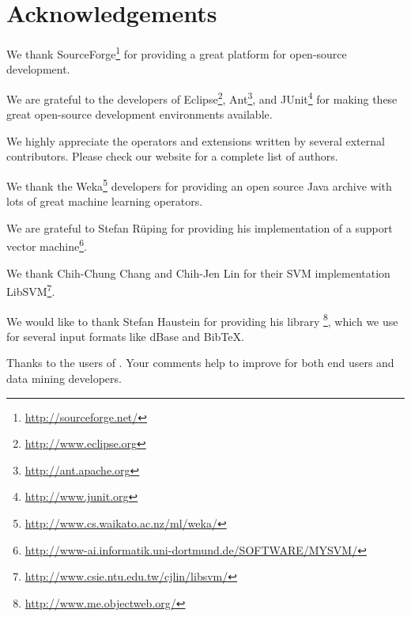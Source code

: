 \chapter{Acknowledgements}
\label{sec:Acknowledgements}

We thank SourceForge\footnote{\url{http://sourceforge.net/}} for providing a
great platform for open-source development.

We are grateful to the developers of
Eclipse\footnote{\url{http://www.eclipse.org}},
Ant\footnote{\url{http://ant.apache.org}}, and
JUnit\footnote{\url{http://www.junit.org}} for making these great
open-source development environments available.

We highly appreciate the operators and extensions written by several external
contributors. Please check our website for a complete list of authors.

We thank the Weka\footnote{\url{http://www.cs.waikato.ac.nz/ml/weka/}} developers for
providing an open source Java archive with lots of great machine learning
operators.

We are grateful to Stefan R\"uping for providing his implementation of a
support vector machine\footnote{\url{http://www-ai.informatik.uni-dortmund.de/SOFTWARE/MYSVM/}}.

We thank Chih-Chung Chang and Chih-Jen Lin for their SVM implementation
LibSVM\footnote{\url{http://www.csie.ntu.edu.tw/cjlin/libsvm/}}.

We would like to thank Stefan Haustein for providing his library
\footnote{\url{http://www.me.objectweb.org/}}, which we use for several
input formats like dBase and BibTeX.

Thanks to the users of \rapidminer. Your comments help to improve \rapidminer for
both end users and data mining developers.